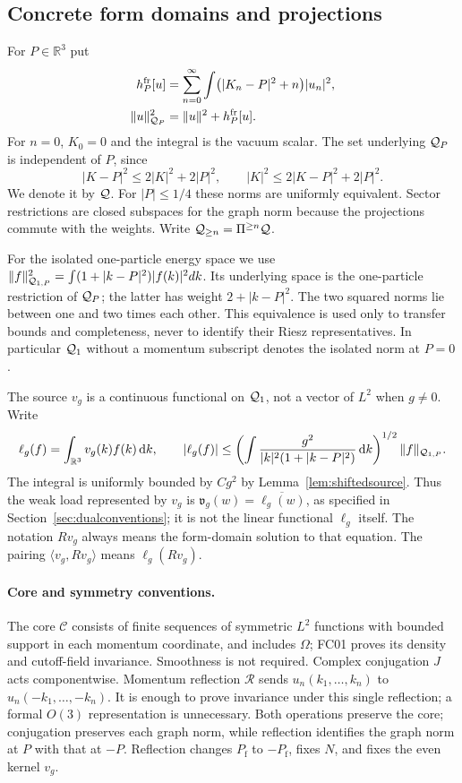 \documentclass[11pt,a4paper]{article}
\theoremstyle{remark}\newtheorem{remark}[theorem]{Remark}
\newcommand{\R}{\mathbb R}\newcommand{\C}{\mathbb C}\newcommand{\N}{\mathbb N}
\newcommand{\Pf}{P_{\mathrm f}}\newcommand{\Id}{I}\newcommand{\Dom}{\operatorname{Dom}}
\newcommand{\ip}[2]{\langle #1,#2\rangle}\newcommand{\norm}[1]{\lVert #1\rVert}
\newcommand{\abs}[1]{\lvert #1\rvert}\newcommand{\rankone}[2]{\lvert #1\rangle\langle #2\rvert}
\newcommand{\dd}{\,\mathrm d}\newcommand{\almosteverywhere}{\text{a.e.}}
\begin{document}
\subsection{Concrete form domains and projections}
For $P\in\R^3$ put
\begin{align}
 h^{\mathrm{fr}}_P[u]&=\sum_{n=0}^{\infty}\int\bigl(\abs{K_n-P}^2+n\bigr)\abs{u_n}^2,\\
 \norm u_{\Q_P}^2&=\norm u^2+h^{\mathrm{fr}}_P[u].\label{eq:qnorm}
\end{align}
For $n=0$, $K_0=0$ and the integral is the vacuum scalar. The set underlying $\mathcal Q_P$ is independent of $P$, since
\[
 \abs{K-P}^2\leq2\abs K^2+2\abs P^2,
 \qquad \abs K^2\leq2\abs{K-P}^2+2\abs P^2.
\]
We denote it by $\mathcal Q$. For $\abs P\leq1/4$ these norms are uniformly equivalent. Sector restrictions are closed subspaces for the graph norm because the projections commute with the weights. Write $\mathcal Q_{\geq n}=\Pi^{\geq n}\mathcal Q$.

For the isolated one-particle energy space we use
$\|f\|_{\mathcal Q_{1,P}}^2=\int(1+|k-P|^2)|f(k)|^2dk$.
Its underlying space is the one-particle restriction of $\mathcal Q_P$; the latter has weight $2+|k-P|^2$. The two squared norms lie between one and two times each other. This equivalence is used only to transfer bounds and completeness, never to identify their Riesz representatives. In particular $\mathcal Q_1$ without a momentum subscript denotes the isolated norm at $P=0$.

The source $v_g$ is a continuous functional on $\mathcal Q_1$, not a vector of $L^2$ when $g\ne0$. Write
\begin{equation}
 \ell_g(f)=\int_{\R^3}v_g(k)f(k)\dd k,
 \qquad
 \abs{\ell_g(f)}\leq
 \left(\int\frac{g^2}{\abs k^2(1+\abs{k-P}^2)}\dd k\right)^{1/2}
 \norm f_{\Q_{1,P}}.\label{eq:sourcebound}
\end{equation}
The integral is uniformly bounded by $C g^2$ by Lemma~\ref{lem:shiftedsource}. Thus the weak load represented by $v_g$ is $\mathfrak v_g(w)=\overline{\ell_g(w)}$, as specified in Section~\ref{sec:dualconventions}; it is not the linear functional $\ell_g$ itself. The notation $Rv_g$ always means the form-domain solution to that equation. The pairing $\ip{v_g}{Rv_g}$ means $\ell_g(Rv_g)$.

\paragraph{Core and symmetry conventions.}
The core $\mathscr C$ consists of finite sequences of symmetric $L^2$ functions with bounded support in each momentum coordinate, and includes $\Omega$; FC01 proves its density and cutoff-field invariance. Smoothness is not required. Complex conjugation $J$ acts componentwise. Momentum reflection $\mathcal R$ sends $u_n(k_1,\ldots,k_n)$ to $u_n(-k_1,\ldots,-k_n)$. It is enough to prove invariance under this single reflection; a formal $O(3)$ representation is unnecessary. Both operations preserve the core; conjugation preserves each graph norm, while reflection identifies the graph norm at $P$ with that at $-P$. Reflection changes $\Pf$ to $-\Pf$, fixes $N$, and fixes the even kernel $v_g$.
\end{document}
